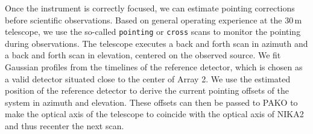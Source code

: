 Once the instrument is correctly focused, we can estimate pointing corrections
before scientific observations.
%
%
%
%
Based on general operating experience at the 30\,m telescope, we use the so-called
{\tt pointing} or {\tt cross} scans to monitor the pointing during observations. The
telescope executes a back and forth scan in azimuth and a back and forth scan in
elevation, centered on the observed source. We fit Gaussian profiles
from the timelines of the reference detector, which is chosen as a
valid detector situated close to the center of Array 2. We use the
estimated position of the reference detector to derive the current pointing
offsets of the system in azimuth and elevation. These offsets can then be passed
to PAKO to make the optical axis of the telescope
to coincide with the optical axis of NIKA2 and thus recenter the next scan.

